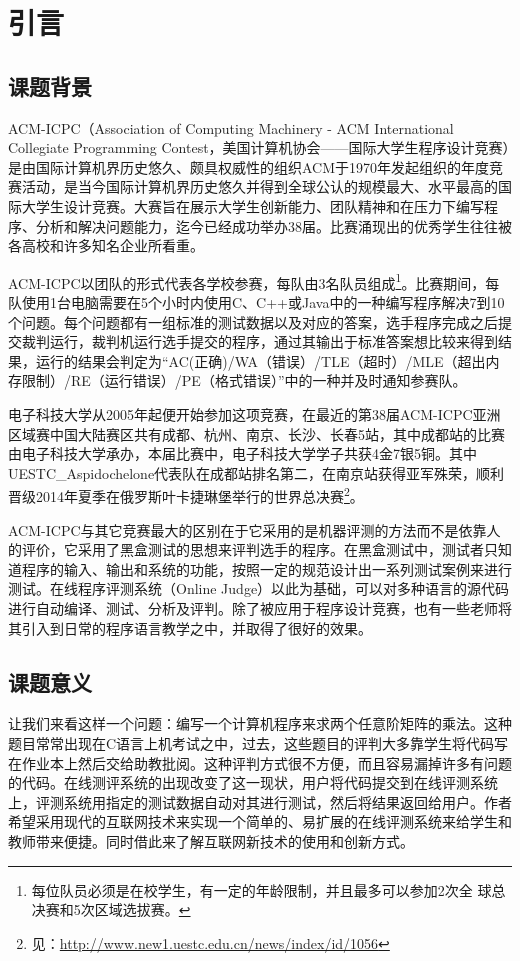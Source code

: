 
\chapter{引言}
\section{课题背景}
ACM-ICPC（Association of Computing Machinery - ACM International Collegiate Programming Contest，美国计算机协会——国际大学生程序设计竞赛）是由国际计算机界历史悠久、颇具权威性的组织ACM于1970年发起组织的年度竞赛活动，是当今国际计算机界历史悠久并得到全球公认的规模最大、水平最高的国际大学生设计竞赛。大赛旨在展示大学生创新能力、团队精神和在压力下编写程序、分析和解决问题能力，迄今已经成功举办38届。比赛涌现出的优秀学生往往被各高校和许多知名企业所看重。

ACM-ICPC以团队的形式代表各学校参赛，每队由3名队员组成\footnote{每位队员必须是在校学生，有一定的年龄限制，并且最多可以参加2次全
球总决赛和5次区域选拔赛。}。比赛期间，每队使用1台电脑需要在5个小时内使用C、C++或Java中的一种编写程序解决7到10个问题。每个问题都有一组标准的测试数据以及对应的答案，选手程序完成之后提交裁判运行，裁判机运行选手提交的程序，通过其输出于标准答案想比较来得到结果，运行的结果会判定为``AC(正确)/WA（错误）/TLE（超时）/MLE（超出内存限制）/RE（运行错误）/PE（格式错误）''中的一种并及时通知参赛队。

电子科技大学从2005年起便开始参加这项竞赛，在最近的第38届ACM-ICPC亚洲区域赛中国大陆赛区共有成都、杭州、南京、长沙、长春5站，其中成都站的比赛由电子科技大学承办，本届比赛中，电子科技大学学子共获4金7银5铜。其中UESTC\_Aspidochelone代表队在成都站排名第二，在南京站获得亚军殊荣，顺利晋级2014年夏季在俄罗斯叶卡捷琳堡举行的世界总决赛\footnote{见：\url{http://www.new1.uestc.edu.cn/news/index/id/1056}}。

ACM-ICPC与其它竞赛最大的区别在于它采用的是机器评测的方法而不是依靠人的评价，它采用了黑盒测试\cite{beizer1995black}的思想来评判选手的程序。在黑盒测试中，测试者只知道程序的输入、输出和系统的功能，按照一定的规范设计出一系列测试案例来进行测试。在线程序评测系统（Online Judge）以此为基础，可以对多种语言的源代码进行自动编译、测试、分析及评判。除了被应用于程序设计竞赛，也有一些老师将其引入到日常的程序语言教学之中，并取得了很好的效果\cite{youfeng2009acm}\cite{guosongshan2007acm}。

\section{课题意义}
让我们来看这样一个问题：编写一个计算机程序来求两个任意阶矩阵的乘法。这种题目常常出现在C语言上机考试之中，过去，这些题目的评判大多靠学生将代码写在作业本上然后交给助教批阅。这种评判方式很不方便，而且容易漏掉许多有问题的代码。在线测评系统的出现改变了这一现状，用户将代码提交到在线评测系统上，评测系统用指定的测试数据自动对其进行测试，然后将结果返回给用户。作者希望采用现代的互联网技术来实现一个简单的、易扩展的在线评测系统来给学生和教师带来便捷。同时借此来了解互联网新技术的使用和创新方式。

